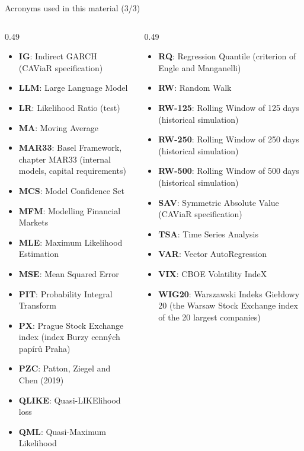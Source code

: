 \begin{frame}{Acronyms used in this material (3/3)}
\begin{columns}[T]
\begin{column}{0.49\textwidth}
\begin{itemize}\setlength{\itemsep}{0pt}
    \item \textbf{IG}: Indirect GARCH (CAViaR specification)
    \item \textbf{LLM}: Large Language Model
    \item \textbf{LR}: Likelihood Ratio (test)
    \item \textbf{MA}: Moving Average
    \item \textbf{MAR33}: Basel Framework, chapter MAR33 (internal models, capital requirements)
    \item \textbf{MCS}: Model Confidence Set
    \item \textbf{MFM}: Modelling Financial Markets
    \item \textbf{MLE}: Maximum Likelihood Estimation
    \item \textbf{MSE}: Mean Squared Error
    \item \textbf{PIT}: Probability Integral Transform
    \item \textbf{PX}: Prague Stock Exchange index (index Burzy cenných papírů Praha)
    \item \textbf{PZC}: Patton, Ziegel and Chen (2019)
    \item \textbf{QLIKE}: Quasi-LIKElihood loss
    \item \textbf{QML}: Quasi-Maximum Likelihood
\end{itemize}
\end{column}
\begin{column}{0.49\textwidth}
\begin{itemize}\setlength{\itemsep}{0pt}
    \item \textbf{RQ}: Regression Quantile (criterion of Engle and Manganelli)
    \item \textbf{RW}: Random Walk
    \item \textbf{RW-125}: Rolling Window of 125 days (historical simulation)
    \item \textbf{RW-250}: Rolling Window of 250 days (historical simulation)
    \item \textbf{RW-500}: Rolling Window of 500 days (historical simulation)
    \item \textbf{SAV}: Symmetric Absolute Value (CAViaR specification)
    \item \textbf{TSA}: Time Series Analysis
    \item \textbf{VAR}: Vector AutoRegression
    \item \textbf{VIX}: CBOE Volatility IndeX
    \item \textbf{WIG20}: Warszawski Indeks Giełdowy 20 (the Warsaw Stock Exchange index of the 20 largest companies)
\end{itemize}
\end{column}
\end{columns}
\end{frame}

